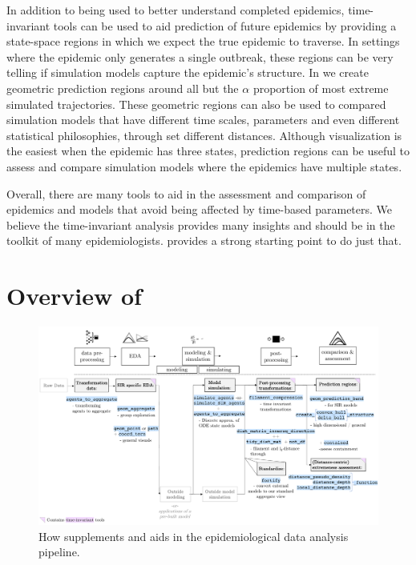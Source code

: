 \documentclass[
  shortnames]{jss}
\begin{document}
In addition to being used to better understand completed epidemics,
time-invariant tools can be used to aid prediction of future epidemics
by providing a state-space regions in which we expect the true epidemic
to traverse. In settings where the epidemic only generates a single
outbreak, these regions can be very telling if simulation models capture
the epidemic's structure. In  we create geometric
prediction regions around all but the \(\alpha\) proportion of most
extreme simulated trajectories. These geometric regions can also be used
to compared simulation models that have different time scales,
parameters and even different statistical philosophies, through set
different distances. Although visualization is the easiest when the
epidemic has three states, prediction regions can be useful to assess
and compare simulation models where the epidemics have multiple states.

Overall, there are many tools to aid in the assessment and comparison of
epidemics and models that avoid being affected by time-based parameters.
We believe the time-invariant analysis provides many insights and should
be in the toolkit of many epidemiologists.  provides a
strong starting point to do just that.

\section[Package overview]{Overview of
}\label{sec:overview}

\afterpage{\clearpage}
\begin{figure}
    \centering
    \includegraphics[width = 1\textwidth]{images/pipeline2_2.pdf}
    \caption{How  supplements and aids in the epidemiological data analysis pipeline.}
    \label{fig:pipeline2}
\end{figure}
\end{document}
